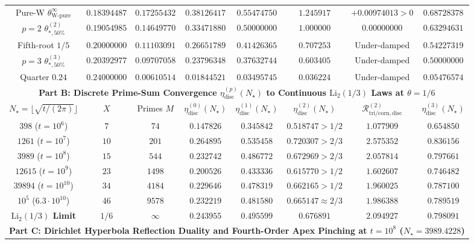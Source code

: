 \documentclass[11pt,reqno]{amsart}
\theoremstyle{definition}
\theoremstyle{remark}
\numberwithin{equation}{section}
\newcommand{\tri}{\mathrm{tri}}
\newcommand{\corn}{\mathrm{corn}}
\begin{document}
\begin{table}[htbp]
\begin{tabular}{@{}cccccccc@{}}
Pure-W $\theta_{\mathrm{W\text{-}pure}}^\infty$ & $0.18394487$ & $0.17255432$ & $0.38126417$ & $0.55474750$ & $1.245917$ & $+0.00974013 > 0$ & $0.68728378$ \\
$p=2$ $\theta_{*,50\%}^{(2)}$ & $0.19054985$ & $0.14649770$ & $0.33471880$ & $\mathbf{0.50000000}$ & $1.000000$ & $0.00000000$ & $0.63294631$ \\
Fifth-root $1/5$ & $0.20000000$ & $0.11103091$ & $0.26651789$ & $0.41426365$ & $0.707253$ & Under-damped & $0.54227319$ \\
$p=3$ $\theta_{*,50\%}^{(3)}$ & $0.20392977$ & $0.09707058$ & $0.23796348$ & $0.37632744$ & $0.603405$ & Under-damped & $\mathbf{0.50000000}$ \\
Quarter $0.24$ & $0.24000000$ & $0.00610514$ & $0.01844521$ & $0.03495745$ & $0.036224$ & Under-damped & $0.05476574$ \\
\midrule
\multicolumn{8}{c}{\textbf{Part B: Discrete Prime-Sum Convergence $\eta_{\mathrm{disc}}^{(p)}(N_\star)$ to Continuous $\mathrm{Li}_2(1/3)$ Laws at $\theta = 1/6$}} \\
\midrule
$N_\star = \lfloor\sqrt{t/(2\pi)}\rfloor$ & $X$ & Primes $M$ & $\eta_{\mathrm{disc}}^{(0)}(N_\star)$ & $\eta_{\mathrm{disc}}^{(1)}(N_\star)$ & $\eta_{\mathrm{disc}}^{(2)}(N_\star)$ & $\mathcal{R}_{\tri/\corn,\mathrm{disc}}^{(2)}$ & $\eta_{\mathrm{disc}}^{(3)}(N_\star)$ \\
\midrule
$398$ ($t = 10^6$) & $7$ & $74$ & $0.147826$ & $0.345842$ & $0.518747 > 1/2$ & $1.077909$ & $0.654850$ \\
$1261$ ($t = 10^7$) & $10$ & $201$ & $0.264895$ & $0.535458$ & $0.720307 > 2/3$ & $2.575352$ & $0.836156$ \\
$3989$ ($t = 10^8$) & $15$ & $544$ & $0.232742$ & $0.486772$ & $0.672969 > 2/3$ & $2.057814$ & $0.797661$ \\
$12615$ ($t = 10^9$) & $23$ & $1498$ & $0.200526$ & $0.433336$ & $0.615770 > 1/2$ & $1.602607$ & $0.746482$ \\
$39894$ ($t = 10^{10}$) & $34$ & $4184$ & $0.229646$ & $0.478319$ & $0.662165 > 1/2$ & $1.960025$ & $0.787100$ \\
$10^5$ ($6.3\cdot 10^{10}$) & $46$ & $9578$ & $0.232219$ & $0.481580$ & $0.665147 \approx 2/3$ & $1.986388$ & $0.789519$ \\
\textbf{$\mathrm{Li}_2(1/3)$ Limit} & $1/6$ & $\infty$ & $\mathbf{0.243955}$ & $\mathbf{0.495599}$ & $\mathbf{0.676891}$ & $\mathbf{2.094927}$ & $\mathbf{0.798091}$ \\
\midrule
\multicolumn{8}{c}{\textbf{Part C: Dirichlet Hyperbola Reflection Duality and Fourth-Order Apex Pinching at $t = 10^8$ ($N_\star = 3989.4228$)}} \\

\end{tabular}
\end{table}
\end{document}
